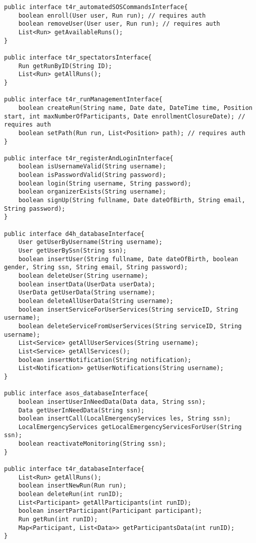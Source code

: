 \documentclass[../../DD.tex]{subfiles}
\begin{document}
\begin{lstlisting}
public interface t4r_automatedSOSCommandsInterface{
	boolean enroll(User user, Run run); // requires auth
	boolean removeUser(User user, Run run); // requires auth
	List<Run> getAvailableRuns();
}

public interface t4r_spectatorsInterface{
	Run getRunByID(String ID);
	List<Run> getAllRuns();
}

public interface t4r_runManagementInterface{
	boolean createRun(String name, Date date, DateTime time, Position start, int maxNumberOfParticipants, Date enrollmentClosureDate); // requires auth
	boolean setPath(Run run, List<Position> path); // requires auth
}

public interface t4r_registerAndLoginInterface{
	boolean isUsernameValid(String username);
	boolean isPasswordValid(String password);
	boolean login(String username, String password);
	boolean organizerExists(String username);
	boolean signUp(String fullname, Date dateOfBirth, String email, String password);
}

public interface d4h_databaseInterface{
	User getUserByUsername(String username);
	User getUserBySsn(String ssn);
	boolean insertUser(String fullname, Date dateOfBirth, boolean gender, String ssn, String email, String password);
	boolean deleteUser(String username);
	boolean insertData(UserData userData);
	UserData getUserData(String username);
	boolean deleteAllUserData(String username);
	boolean insertServiceForUserServices(String serviceID, String username);
	boolean deleteServiceFromUserServices(String serviceID, String username);
	List<Service> getAllUserServices(String username);
	List<Service> getAllServices();
	boolean insertNotification(String notification);
	List<Notification> getUserNotifications(String username);
}

public interface asos_databaseInterface{
	boolean insertUserInNeedData(Data data, String ssn);
	Data getUserInNeedData(String ssn);
	boolean insertCall(LocalEmergencyServices les, String ssn);
	LocalEmergencyServices getLocalEmergencyServicesForUser(String ssn);
	boolean reactivateMonitoring(String ssn);
}

public interface t4r_databaseInterface{
	List<Run> getAllRuns();
	boolean insertNewRun(Run run);
	boolean deleteRun(int runID);
	List<Participant> getAllParticipants(int runID);
	boolean insertParticipant(Participant participant);
	Run getRun(int runID);
	Map<Participant, List<Data>> getParticipantsData(int runID);
}

\end{lstlisting}
\end{document}
